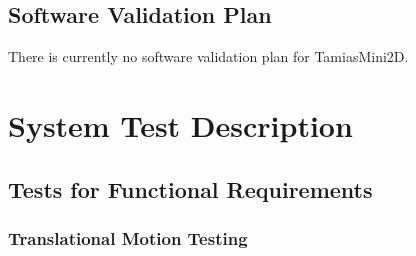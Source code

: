 \documentclass[12pt, titlepage]{article}
\begin{document}
\subsection{Software Validation Plan}

	There is currently no software validation plan for TamiasMini2D.

\section{System Test Description}
	
\subsection{Tests for Functional Requirements}



\subsubsection{Translational Motion Testing}
	
\paragraph{}
\end{document}
